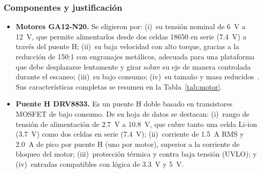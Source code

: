 \subsubsection{Componentes y justificación}
\begin{itemize}[nosep]
  \item \textbf{Motores GA12-N20.} Se eligieron por: (i)~su tensión nominal de \SI{6}{V} a \SI{12}{V}, que permite alimentarlos desde dos celdas 18650 en serie (\SI{7,4}{V}) a través del puente H; (ii)~su baja velocidad con alto torque, gracias a la reducción de 150:1 con engranajes metálicos, adecuada para una plataforma que debe desplazarse lentamente y girar sobre su eje de manera controlada durante el escaneo; (iii)~su bajo consumo; (iv)~su tamaño y masa reducidos~\cite{ga12n20}. Sus características completas se resumen en la Tabla~\ref{tab:motor}.

  \item \textbf{Puente H DRV8833.} Es un puente H doble basado en transistores MOSFET de bajo consumo. De su hoja de datos se destacan: (i)~rango de tensión de alimentación de \SI{2,7}{V} a \SI{10,8}{V}, que cubre tanto una celda Li-ion (\SI{3,7}{V}) como dos celdas en serie (\SI{7,4}{V}); (ii)~corriente de \SI{1,5}{A} RMS y \SI{2,0}{A} de pico por puente H (uno por motor), superior a la corriente de bloqueo del motor; (iii)~protección térmica y contra baja tensión (UVLO); y (iv)~entradas compatibles con lógica de \SI{3,3}{V} y \SI{5}{V}.
\end{itemize}


